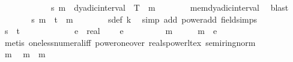 \begin{isabellebody}
\ \ \ \ \isamarkupfalse%
\isanewline
\ \ \ \ \isamarkupfalse%
\ \isamarkupfalse%
\ {\isachardoublequoteopen}s\ m\ {\isasymin}\ dyadic{\isacharunderscore}{\kern0pt}interval\ {}\ T{\isachardoublequoteclose}\ \ m\isanewline
\ \ \ \ \ \ \isamarkupfalse%
\ mem{\isacharunderscore}{\kern0pt}dyadic{\isacharunderscore}{\kern0pt}interval\ \isamarkupfalse%
\ blast\isanewline
\ \ \ \ \isamarkupfalse%
\ \isamarkupfalse%
\ {\isachardoublequoteopen}s\ m\ {\isasymnoteq}\ t{\isachardoublequoteclose}\ \ m\isanewline
\ \ \ \ \ \ \isamarkupfalse%
\ s{\isacharunderscore}{\kern0pt}def\ k{\isacharparenleft}{\kern0pt}{}{\isacharparenright}{\kern0pt}\ \isamarkupfalse%
\ {\isacharparenleft}{\kern0pt}simp\ add{\isacharcolon}{\kern0pt}\ power{\isacharunderscore}{\kern0pt}add\ field{\isacharunderscore}{\kern0pt}simps{\isacharparenright}{\kern0pt}\isanewline
\ \ \ \ \isamarkupfalse%
\ \isamarkupfalse%
\ {\isachardoublequoteopen}s\ {\isasymlonglonglongrightarrow}\ t{\isachardoublequoteclose}\isanewline
\ \ \ \ \isamarkupfalse%
\isanewline
\ \ \ \ \ \ \isamarkupfalse%
\ e\ {\isacharcolon}{\kern0pt}{\isacharcolon}{\kern0pt}\ real\ \isamarkupfalse%
\ {\isachardoublequoteopen}{}\ {\isacharless}{\kern0pt}\ e{\isachardoublequoteclose}\isanewline
\ \ \ \ \ \ \isamarkupfalse%
\ \isamarkupfalse%
\ m\ \ {\isachardoublequoteopen}{}\ {\isacharslash}{\kern0pt}\ {}\ {\isacharcircum}{\kern0pt}\ m\ {\isacharless}{\kern0pt}\ e{\isachardoublequoteclose}\isanewline
\ \ \ \ \ \ \ \ \isamarkupfalse%
\ {\isacharparenleft}{\kern0pt}metis\ one{\isacharunderscore}{\kern0pt}less{\isacharunderscore}{\kern0pt}numeral{\isacharunderscore}{\kern0pt}iff\ power{\isacharunderscore}{\kern0pt}one{\isacharunderscore}{\kern0pt}over\ reals{\isacharunderscore}{\kern0pt}power{\isacharunderscore}{\kern0pt}lt{\isacharunderscore}{\kern0pt}ex\ semiring{\isacharunderscore}{\kern0pt}norm{\isacharparenleft}{\kern0pt}{}{}{\isacharparenright}{\kern0pt}{\isacharparenright}{\kern0pt}\isanewline
\ \ \ \ \ \ \isacommand{{\isacharbraceleft}{\kern0pt}}\isamarkupfalse%
\ \isamarkupfalse%
\ m{\isacharprime}{\kern0pt}\ \isamarkupfalse%
\ {\isachardoublequoteopen}m{\isacharprime}{\kern0pt}\ {\isasymge}\ m{\isachardoublequoteclose}\isanewline

\end{isabellebody}
